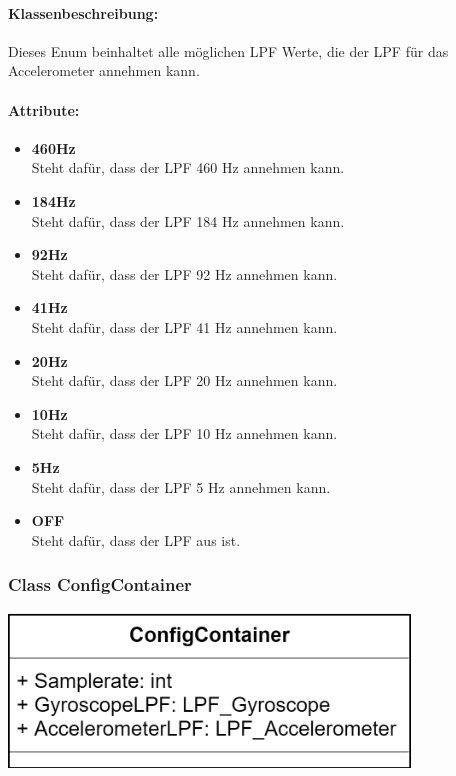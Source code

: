 \documentclass[a4paper,12pt]{article}
\begin{document}
\paragraph{Klassenbeschreibung:}
Dieses Enum beinhaltet alle möglichen LPF Werte, die der LPF für das Accelerometer annehmen kann.

\paragraph{Attribute:}
\begin{itemize}
	\item \textbf{460Hz}\\Steht dafür, dass der LPF 460 Hz annehmen kann.
	\item \textbf{184Hz}\\Steht dafür, dass der LPF 184 Hz annehmen kann.
	\item \textbf{92Hz}\\Steht dafür, dass der LPF 92 Hz annehmen kann.
	\item \textbf{41Hz}\\Steht dafür, dass der LPF 41 Hz annehmen kann.
	\item \textbf{20Hz}\\Steht dafür, dass der LPF 20 Hz annehmen kann.
	\item \textbf{10Hz}\\Steht dafür, dass der LPF 10 Hz annehmen kann.
	\item \textbf{5Hz}\\Steht dafür, dass der LPF 5 Hz annehmen kann.
	\item \textbf{OFF}\\Steht dafür, dass der LPF aus ist.\\
\end{itemize}

\begin{minipage}[b]{0.5\textwidth}
	\subsubsection{Class ConfigContainer}
	\end{minipage}
	\begin{minipage}[c]{0.5\textwidth}
	\includegraphics[width=0.8\textwidth]{bilder/BibPackageKlassen/ConfigContainer.png}
\end{minipage}
\end{document}
